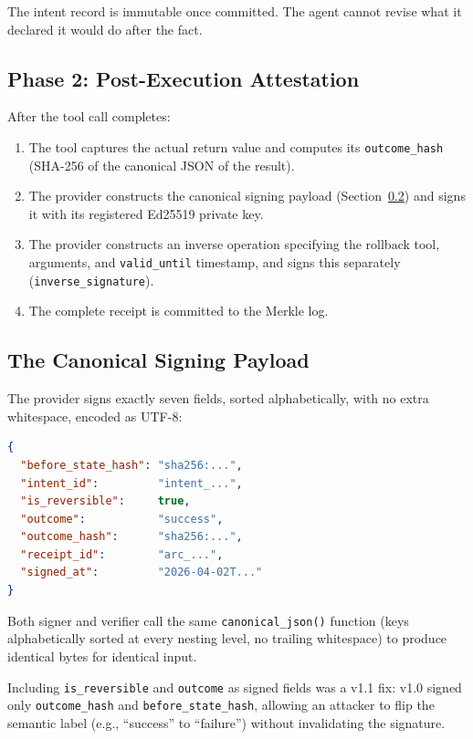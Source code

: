 \documentclass[10pt,twocolumn]{article}
\begin{document}
The intent record is immutable once committed. The agent cannot revise
what it declared it would do after the fact.

\subsection{Phase 2: Post-Execution Attestation}

After the tool call completes:
\begin{enumerate}[noitemsep,topsep=2pt]
  \item The tool captures the actual return value and computes its
    \texttt{outcome\_hash} (SHA-256 of the canonical JSON of the result).
  \item The provider constructs the canonical signing payload (Section~\ref{sec:payload})
    and signs it with its registered Ed25519 private key.
  \item The provider constructs an inverse operation specifying the rollback
    tool, arguments, and \texttt{valid\_until} timestamp, and signs this
    separately (\texttt{inverse\_signature}).
  \item The complete receipt is committed to the Merkle log.
\end{enumerate}

\subsection{The Canonical Signing Payload}
\label{sec:payload}

The provider signs exactly seven fields, sorted alphabetically, with no extra
whitespace, encoded as UTF-8:

\begin{lstlisting}[language=json]
{
  "before_state_hash": "sha256:...",
  "intent_id":         "intent_...",
  "is_reversible":     true,
  "outcome":           "success",
  "outcome_hash":      "sha256:...",
  "receipt_id":        "arc_...",
  "signed_at":         "2026-04-02T..."
}
\end{lstlisting}

\noindent Both signer and verifier call the same \texttt{canonical\_json()}
function (keys alphabetically sorted at every nesting level, no trailing
whitespace) to produce identical bytes for identical input.

Including \texttt{is\_reversible} and \texttt{outcome} as signed fields
was a v1.1 fix: v1.0 signed only \texttt{outcome\_hash} and \texttt{before\_state\_hash},
allowing an attacker to flip the semantic label (e.g., ``success'' to ``failure'')
without invalidating the signature.
\end{document}
